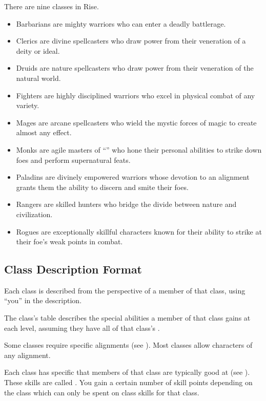     There are nine classes in Rise.
    \begin{itemize}
        \item Barbarians are mighty warriors who can enter a deadly battlerage.
        \item Clerics are divine spellcasters who draw power from their veneration of a deity or ideal.
        \item Druids are nature spellcasters who draw power from their veneration of the natural world.
        \item Fighters are highly disciplined warriors who excel in physical combat of any variety.
        \item Mages are arcane spellcasters who wield the mystic forces of magic to create almost any effect.
        \item Monks are agile masters of ``\ki'' who hone their personal abilities to strike down foes and perform supernatural feats.
        \item Paladins are divinely empowered warriors whose devotion to an alignment grants them the ability to discern and smite their foes.
        \item Rangers are skilled hunters who bridge the divide between nature and civilization.
        \item Rogues are exceptionally skillful characters known for their ability to strike at their foe's weak points in combat.
    \end{itemize}

    \subsection{Class Description Format}
        Each class is described from the perspective of a member of that class, using ``you'' in the description.

        The class's table describes the special abilities a member of that class gains at each level, assuming they have all of that class's .

        Some classes require specific alignments (see ).
        Most classes allow characters of any alignment.

        Each class has specific  that members of that class are typically good at (see ).
        These skills are called .
        You gain a certain number of skill points depending on the class which can only be spent on class skills for that class.

